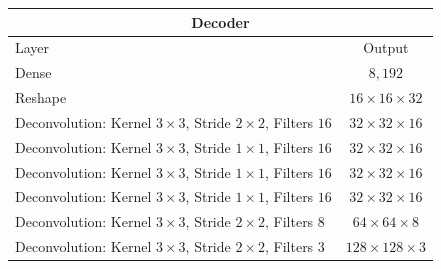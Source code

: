 \begin{center}
    \begin{table}[H]
        \centering
        \begin{tabular}{ | l | c | }
            \multicolumn{2}{c}{Decoder} \\ \hline
            Layer & Output\\ \hline
            Dense                                                                   & $8,192$                   \\
            Reshape                                                                 & $16\times 16\times  32 $  \\
            Deconvolution: Kernel $3\times3$, Stride $2\times2$, Filters $16 $      & $32\times 32\times  16 $  \\
            Deconvolution: Kernel $3\times3$, Stride $1\times1$, Filters $16 $      & $32\times 32\times  16 $  \\
            Deconvolution: Kernel $3\times3$, Stride $1\times1$, Filters $16 $      & $32\times 32\times  16 $  \\
            Deconvolution: Kernel $3\times3$, Stride $1\times1$, Filters $16 $      & $32\times 32\times  16 $  \\
            Deconvolution: Kernel $3\times3$, Stride $2\times2$, Filters $8  $      & $64\times 64\times  8  $  \\
            Deconvolution: Kernel $3\times3$, Stride $2\times2$, Filters $3  $      & $128\times 128\times3  $  \\
            \hline
        \end{tabular} 
    \end{table}
\end{center}

\vspace{-3em}

